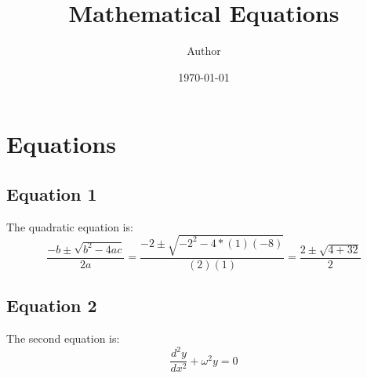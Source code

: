 \documentclass{article}
\begin{document}
	\title{Mathematical Equations}
	\author{Author}
	\date{\today}
	\maketitle
	\section*{Equations}
	\subsection*{Equation 1}
	The quadratic equation is:
	\begin{equation}
		\frac{{-b\pm\sqrt{b^2-4ac}}}{2a}=\frac{-2\pm\sqrt{-2^2-4*(1)(-8)}}{(2)(1)}=\frac{2\pm\sqrt{4+32}}{2}
	\end{equation}
	\subsection*{Equation 2}
	The second equation is:
	\begin{equation}
		\frac{d^2y}{dx^2}+\omega^2y=0
	\end{equation}
\end{document}
